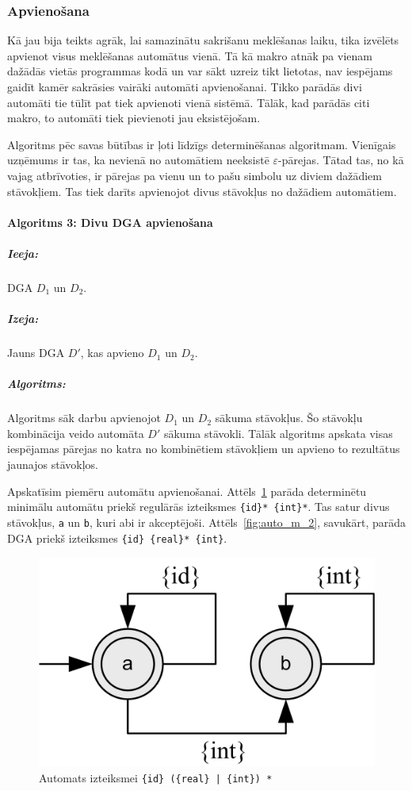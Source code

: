 \subsubsection{Apvienošana}

Kā jau bija teikts agrāk, lai samazinātu sakrišanu meklēšanas laiku, tika izvēlēts apvienot visus meklēšanas automātus vienā. Tā kā makro atnāk pa vienam dažādās vietās programmas kodā un var sākt uzreiz tikt lietotas, nav iespējams gaidīt kamēr sakrāsies vairāki automāti apvienošanai. Tikko parādās divi automāti tie tūlīt pat tiek apvienoti vienā sistēmā. Tālāk, kad parādās citi makro, to automāti tiek pievienoti jau eksistējošam.

Algoritms pēc savas būtības ir ļoti līdzīgs determinēšanas algoritmam. Vienīgais uzņēmums ir tas, ka nevienā no automātiem neeksistē $\varepsilon$-pārejas. Tātad tas, no kā vajag atbrīvoties, ir pārejas pa vienu un to pašu simbolu uz diviem dažādiem stāvokļiem. Tas tiek darīts apvienojot divus stāvokļus no dažādiem automātiem. 

\paragraph*{Algoritms 3: Divu DGA apvienošana}
\subparagraph{Ieeja:}DGA $D_1$ un $D_2$.
\subparagraph{Izeja:}Jauns DGA $D'$, kas apvieno $D_1$ un $D_2$.
\subparagraph{Algoritms:} 

Algoritms sāk darbu apvienojot $D_1$ un $D_2$ sākuma stāvokļus. Šo stāvokļu kombinācija veido automāta $D'$ sākuma stāvokli. Tālāk algoritms apskata visas iespējamas pārejas no katra no kombinētiem stāvokļiem un apvieno to rezultātus jaunajos stāvokļos. 

Apskatīsim piemēru automātu apvienošanai. Attēls~\ref{fig:auto_m_1} parāda determinētu minimālu automātu priekš regulārās izteiksmes \verb|{id}* {int}*|. Tas satur divus stāvokļus, \verb|a| un \verb|b|, kuri abi ir akceptējoši. Attēls~\ref{fig:auto_m_2}, savukārt, parāda DGA priekš izteiksmes \verb|{id} {real}* {int}|.

\begin{figure}[H]
  \centering
    \includegraphics[scale=1.5]{pictures/auto_m_1}
  \caption{\label{fig:auto_m_1}Automats izteiksmei \texttt{\{id\} (\{real\} | \{int\}) *}}
\end{figure}


